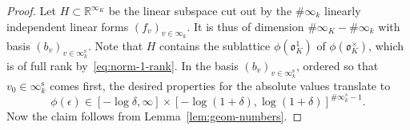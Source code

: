 \documentclass[a4paper, twoside, 11pt]{amsart}
\theoremstyle{definition}
\newcommand{\fo}{\mathfrak{o}}
\newcommand{\RR}{\mathbb{R}}
\begin{document}
\begin{proof}
    Let $H\subset \RR^{\infty_K}$ be the linear subspace cut out by the $\# \infty_k$ linearly independent linear forms $(f_{v})_{v\in\infty_k}$. It is thus of dimension $\#\infty_K - \#\infty_k$ with basis $(b_{v})_{v\in \infty_k^{\mathrm s}}$.
    Note that $H$ contains the sublattice $\phi(\fo_K^1)$ of $\phi(\fo_K^\times)$, which is of full rank by~\eqref{eq:norm-1-rank}.
	In the basis $(b_{v})_{v\in\infty_k^{\mathrm s}}$, ordered so that $v_0\in \infty_k^{\mathrm s}$ comes first, the desired properties for the absolute values translate to
	\begin{equation*}
		\phi(\epsilon) \in [- \log \delta ,\infty] \times [-\log (1+\delta), \log(1+\delta)]^{\#\infty_k^s -1}.
	\end{equation*}
	Now the claim follows from Lemma~\ref{lem:geom-numbers}.
\end{proof}
    
\end{document}

